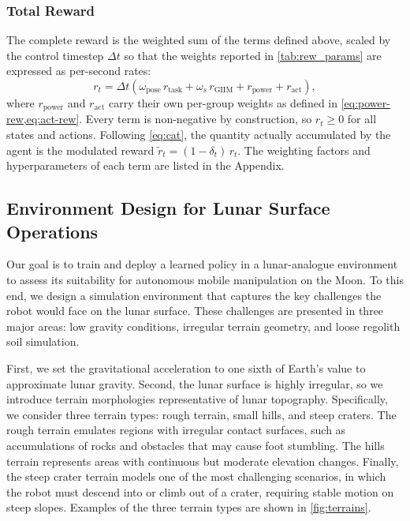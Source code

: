 \subsubsection{Total Reward}

The complete reward is the weighted sum of the terms defined above, scaled by the control timestep $\Delta t$ so that the weights reported in \cref{tab:rew_params} are expressed as per-second rates:
%
\begin{equation}
    r_t = \Delta t \left(
    \omega_{\text{pose}}\, r_{\text{task}}
    + \omega_{s}\, r_{\text{GIIM}}
    + r_{\text{power}}
    + r_{\text{act}}
    \right),
    \label{eq:total-reward}
\end{equation}
%
where $r_{\text{power}}$ and $r_{\text{act}}$ carry their own per-group weights as defined in \cref{eq:power-rew,eq:act-rew}. Every term is non-negative by construction, so $r_t \ge 0$ for all states and actions. Following \cref{eq:cat}, the quantity actually accumulated by the agent is the modulated reward $\tilde{r}_t = (1-\delta_t)\, r_t$. The weighting factors and hyperparameters of each term are listed in the Appendix.

\subsection{Environment Design for Lunar Surface Operations} \label{sec:lunar-design}

Our goal is to train and deploy a learned policy in a lunar-analogue environment to assess its suitability for autonomous mobile manipulation on the Moon. To this end, we design a simulation environment that captures the key challenges the robot would face on the lunar surface. These challenges are presented in three major areas: low gravity conditions, irregular terrain geometry, and loose regolith soil simulation.

First, we set the gravitational acceleration to one sixth of Earth’s value to approximate lunar gravity. Second, the lunar surface is highly irregular, so we introduce terrain morphologies representative of lunar topography. Specifically, we consider three terrain types: rough terrain, small hills, and steep craters. The rough terrain emulates regions with irregular contact surfaces, such as accumulations of rocks and obstacles that may cause foot stumbling. The hills terrain represents areas with continuous but moderate elevation changes. Finally, the steep crater terrain models one of the most challenging scenarios, in which the robot must descend into or climb out of a crater, requiring stable motion on steep slopes. Examples of the three terrain types are shown in \cref{fig:terrains}.

